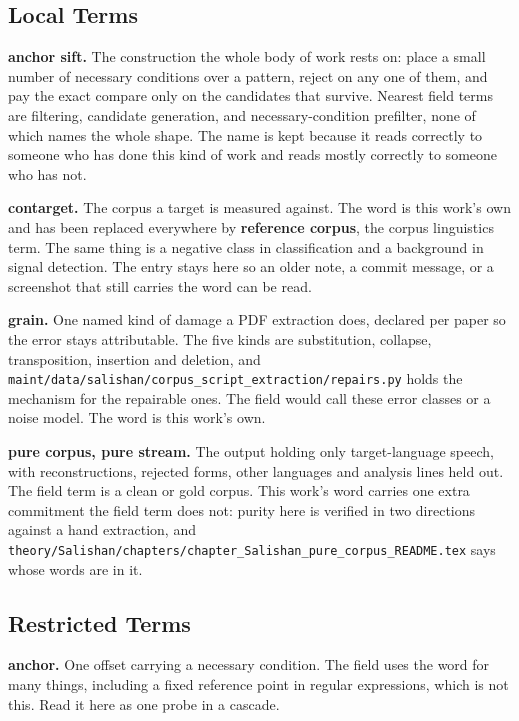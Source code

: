 \subsection{Local Terms}

\textbf{anchor sift.} The construction the whole body of work rests on: place a small number of necessary conditions over a pattern, reject on any one of them, and pay the exact compare only on the candidates that survive. Nearest field terms are filtering, candidate generation, and necessary-condition prefilter, none of which names the whole shape. The name is kept because it reads correctly to someone who has done this kind of work and reads mostly correctly to someone who has not.

\textbf{contarget.} The corpus a target is measured against. The word is this work's own and has been replaced everywhere by \textbf{reference corpus}, the corpus linguistics term. The same thing is a negative class in classification and a background in signal detection. The entry stays here so an older note, a commit message, or a screenshot that still carries the word can be read.

\textbf{grain.} One named kind of damage a PDF extraction does, declared per paper so the error stays attributable. The five kinds are substitution, collapse, transposition, insertion and deletion, and \texttt{maint/\allowbreak{}data/\allowbreak{}salishan/\allowbreak{}corpus\_\allowbreak{}script\_\allowbreak{}extraction/\allowbreak{}repairs.\allowbreak{}py} holds the mechanism for the repairable ones. The field would call these error classes or a noise model. The word is this work's own.

\textbf{pure corpus, pure stream.} The output holding only target-language speech, with reconstructions, rejected forms, other languages and analysis lines held out. The field term is a clean or gold corpus. This work's word carries one extra commitment the field term does not: purity here is verified in two directions against a hand extraction, and \texttt{theory/\allowbreak{}Salishan/\allowbreak{}chapters/\allowbreak{}chapter\_\allowbreak{}Salishan\_\allowbreak{}pure\_\allowbreak{}corpus\_\allowbreak{}README.\allowbreak{}tex} says whose words are in it.

\subsection{Restricted Terms}

\textbf{anchor.} One offset carrying a necessary condition. The field uses the word for many things, including a fixed reference point in regular expressions, which is not this. Read it here as one probe in a cascade.

